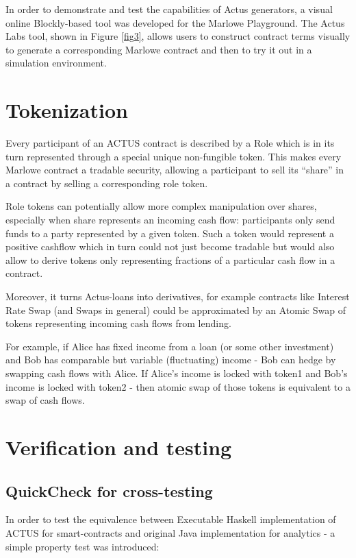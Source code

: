 \documentclass[runningheads]{llncs}
\begin{document}
In order to demonstrate and test the capabilities of Actus generators,
a visual online Blockly-based tool was developed for the Marlowe Playground.
The Actus Labs tool, shown in Figure \ref{fig3}, allows users to construct contract terms visually
to generate a corresponding Marlowe contract and then to try it out in a simulation 
environment.

\section{Tokenization}
\label{tokenization}

Every participant of an ACTUS contract is described by a Role which
is in its turn represented through a special unique non-fungible token.
This makes every Marlowe contract a tradable security, allowing a
participant to sell its ``share'' in a contract by selling a corresponding
role token.

Role tokens can potentially allow more complex manipulation over shares,
especially when share represents an incoming cash flow: participants
only send funds to a party represented by a given token. Such a token
would represent a positive cashflow which in turn could not just become
tradable but would also allow to derive tokens only representing fractions
of a particular cash flow in a contract.

Moreover, it turns Actus-loans into derivatives, for example contracts
like Interest Rate Swap (and Swaps in general) could be approximated
by an Atomic Swap of tokens representing incoming cash flows from
lending.

For example, if Alice has fixed income from a loan (or some other
investment) and Bob has comparable but variable (fluctuating) income
- Bob can hedge by swapping cash flows with Alice. If Alice's income
is locked with token1 and Bob's income is locked with token2 - then
atomic swap of those tokens is equivalent to a swap of cash flows.

\section{Verification and testing}
\label{verification}

\subsection{QuickCheck for cross-testing}

In order to test the equivalence between Executable Haskell implementation
of ACTUS for smart-contracts and original Java implementation for
analytics - a simple property test was introduced:
\end{document}
